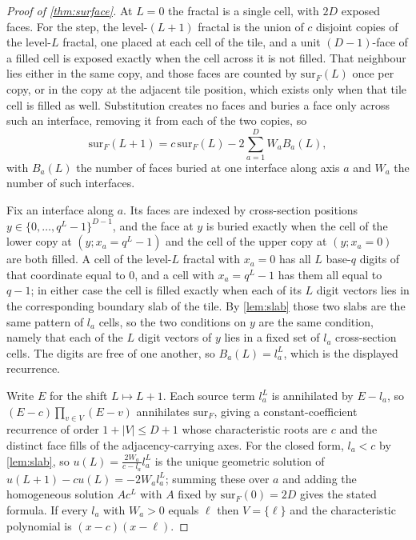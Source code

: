 \documentclass[11pt]{amsart}
\theoremstyle{definition}
\theoremstyle{remark}
\begin{document}
\begin{proof}[Proof of \cref{thm:surface}]
At $L = 0$ the fractal is a single cell, with $2D$ exposed faces. For the step, the level-$(L+1)$ fractal is the union of $c$ disjoint copies of the level-$L$ fractal, one placed at each cell of the tile, and a unit $(D-1)$-face of a filled cell is exposed exactly when the cell across it is not filled. That neighbour lies either in the same copy, and those faces are counted by $\mathrm{sur}_{F}(L)$ once per copy, or in the copy at the adjacent tile position, which exists only when that tile cell is filled as well. Substitution creates no faces and buries a face only across such an interface, removing it from each of the two copies, so
\[
  \mathrm{sur}_{F}(L+1) = c\,\mathrm{sur}_{F}(L) - 2\sum_{a=1}^{D} W_{a}B_{a}(L),
\]
with $B_{a}(L)$ the number of faces buried at one interface along axis $a$ and $W_{a}$ the number of such interfaces.

Fix an interface along $a$. Its faces are indexed by cross-section positions $y \in \{0,\dots,q^{L}-1\}^{D-1}$, and the face at $y$ is buried exactly when the cell of the lower copy at $(y; x_{a} = q^{L}-1)$ and the cell of the upper copy at $(y; x_{a} = 0)$ are both filled. A cell of the level-$L$ fractal with $x_{a} = 0$ has all $L$ base-$q$ digits of that coordinate equal to $0$, and a cell with $x_{a} = q^{L}-1$ has them all equal to $q-1$; in either case the cell is filled exactly when each of its $L$ digit vectors lies in the corresponding boundary slab of the tile. By \cref{lem:slab} those two slabs are the same pattern of $l_{a}$ cells, so the two conditions on $y$ are the same condition, namely that each of the $L$ digit vectors of $y$ lies in a fixed set of $l_{a}$ cross-section cells. The digits are free of one another, so $B_{a}(L) = l_{a}^{L}$, which is the displayed recurrence.

Write $E$ for the shift $L \mapsto L+1$. Each source term $l_{a}^{L}$ is annihilated by $E - l_{a}$, so $(E-c)\prod_{v \in V}(E-v)$ annihilates $\mathrm{sur}_{F}$, giving a constant-coefficient recurrence of order $1+|V| \le D+1$ whose characteristic roots are $c$ and the distinct face fills of the adjacency-carrying axes. For the closed form, $l_{a} < c$ by \cref{lem:slab}, so $u(L) = \frac{2W_{a}}{c-l_{a}}l_{a}^{L}$ is the unique geometric solution of $u(L+1)-cu(L) = -2W_{a}l_{a}^{L}$; summing these over $a$ and adding the homogeneous solution $Ac^{L}$ with $A$ fixed by $\mathrm{sur}_{F}(0) = 2D$ gives the stated formula. If every $l_{a}$ with $W_{a}>0$ equals $\ell$ then $V = \{\ell\}$ and the characteristic polynomial is $(x-c)(x-\ell)$.
\end{proof}
\end{document}
